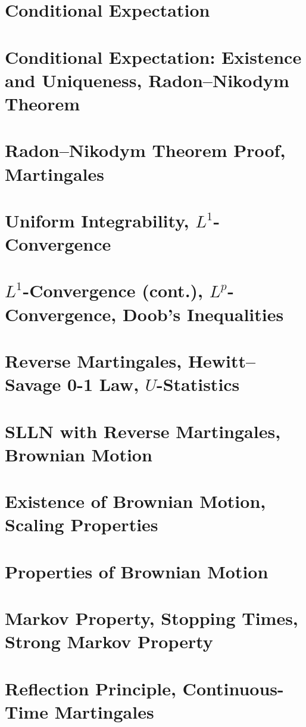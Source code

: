 \documentclass[12pt, a4paper]{report}
\begin{document}


\tableofcontents
\newpage

\chapter{Conditional Expectation}


\chapter{Conditional Expectation: Existence and Uniqueness, Radon--Nikodym Theorem}


\chapter{Radon--Nikodym Theorem Proof, Martingales}


\chapter{Uniform Integrability, \texorpdfstring{$L^1$}{L1}-Convergence}


\chapter{\texorpdfstring{$L^1$}{L1}-Convergence (cont.), \texorpdfstring{$L^p$}{Lp}-Convergence, Doob's Inequalities}


\chapter{Reverse Martingales, Hewitt--Savage 0-1 Law, \texorpdfstring{$U$}{U}-Statistics}


\chapter{SLLN with Reverse Martingales, Brownian Motion}


\chapter{Existence of Brownian Motion, Scaling Properties}


\chapter{Properties of Brownian Motion}


\chapter{Markov Property, Stopping Times, Strong Markov Property}


\chapter{Reflection Principle, Continuous-Time Martingales}

\end{document}
